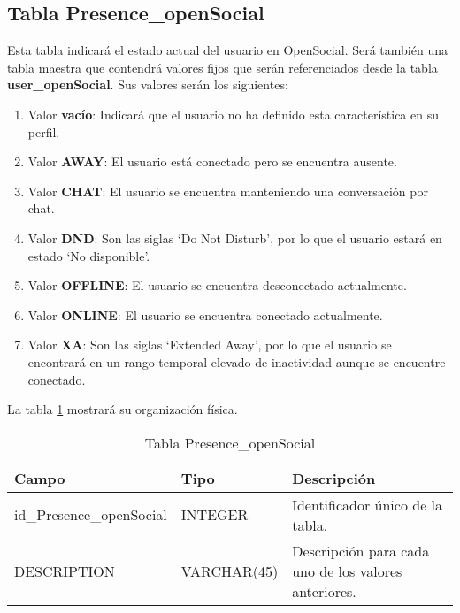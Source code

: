 \subsection{Tabla Presence\_openSocial}
Esta tabla indicará el estado actual del usuario en OpenSocial. Será también una tabla maestra que contendrá valores fijos que serán referenciados desde la tabla \textbf{user\_openSocial}. Sus valores serán los siguientes:
\begin{enumerate}
\item Valor \textbf{vacío}: Indicará que el usuario no ha definido esta característica en su perfil.
\item Valor \textbf{AWAY}: El usuario está conectado pero se encuentra ausente.
\item Valor \textbf{CHAT}: El usuario se encuentra manteniendo una conversación por chat.
\item Valor \textbf{DND}: Son las siglas `Do Not Disturb', por lo que el usuario estará en estado `No disponible'.
\item Valor \textbf{OFFLINE}: El usuario se encuentra desconectado actualmente.
\item Valor \textbf{ONLINE}: El usuario se encuentra conectado actualmente.
\item Valor \textbf{XA}: Son las siglas `Extended Away', por lo que el usuario se encontrará en un rango temporal elevado de inactividad aunque se encuentre conectado.
\end{enumerate}
\bigskip
\par
La tabla \ref{tabPresenceOpenSocial} mostrará su organización física.
\bigskip
\par
\begin{table}[h]
\begin{center}
\begin{tabular}{| l | l | p{60mm} |}\hline
\textbf{Campo}&\textbf{Tipo}&\textbf{Descripción} \\ \hline
id\_Presence\_openSocial & INTEGER & Identificador único de la tabla. \\ \hline
DESCRIPTION & VARCHAR(45) & Descripción para cada uno de los valores anteriores. \\ \hline
\end{tabular}
\end{center}
\caption{Tabla Presence\_openSocial} \label{tabPresenceOpenSocial}
\end{table}

